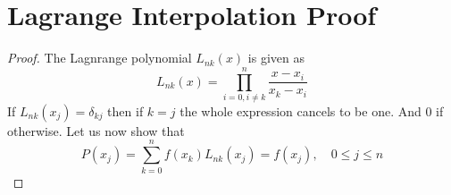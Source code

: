 \section{Lagrange Interpolation Proof}
\begin{proof}
    The Lagnrange polynomial \(L_{nk} (x) \) is given as 
    \[
        L_{nk}(x) = 
        \prod_{i=0, i\neq  k}^n \frac{x-x_i}{x_k - x_i} 
    \]
    If \(L_{nk} (x_j) = \delta_{kj} \) then if \(k=j\) the whole expression cancels to be one. And \(0\) if otherwise. 
    Let us now show that 
    \[
        P(x_j) = \sum_{k=0}^{n} f(x_k)L_{nk} (x_j) = f(x_j), \quad 0 \leq  j \leq n
    \]
\end{proof}